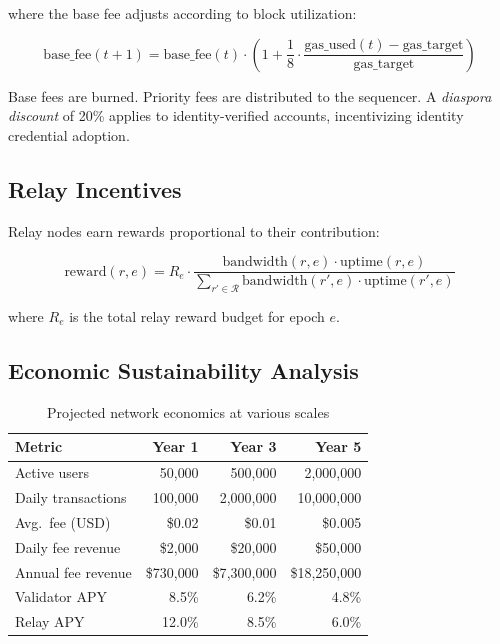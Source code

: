 \documentclass[11pt,a4paper]{article}
\begin{document}
where the base fee adjusts according to block utilization:

\begin{equation}
\text{base\_fee}(t+1) = \text{base\_fee}(t) \cdot \left(1 + \frac{1}{8} \cdot \frac{\text{gas\_used}(t) - \text{gas\_target}}{\text{gas\_target}}\right)
\end{equation}

Base fees are burned. Priority fees are distributed to the sequencer. A \emph{diaspora discount} of 20\% applies to identity-verified accounts, incentivizing identity credential adoption.

\subsection{Relay Incentives}

Relay nodes earn rewards proportional to their contribution:

\begin{equation}
\text{reward}(r, e) = R_e \cdot \frac{\text{bandwidth}(r, e) \cdot \text{uptime}(r, e)}{\sum_{r' \in \mathcal{R}} \text{bandwidth}(r', e) \cdot \text{uptime}(r', e)}
\end{equation}

where $R_e$ is the total relay reward budget for epoch $e$.

\subsection{Economic Sustainability Analysis}

\begin{table}[H]
\centering
\caption{Projected network economics at various scales}
\label{tab:economics}
\begin{tabular}{lrrr}
\toprule
\textbf{Metric} & \textbf{Year 1} & \textbf{Year 3} & \textbf{Year 5} \\
\midrule
Active users & 50{,}000 & 500{,}000 & 2{,}000{,}000 \\
Daily transactions & 100{,}000 & 2{,}000{,}000 & 10{,}000{,}000 \\
Avg.\ fee (USD) & \$0.02 & \$0.01 & \$0.005 \\
Daily fee revenue & \$2{,}000 & \$20{,}000 & \$50{,}000 \\
Annual fee revenue & \$730{,}000 & \$7{,}300{,}000 & \$18{,}250{,}000 \\
Validator APY & 8.5\% & 6.2\% & 4.8\% \\
Relay APY & 12.0\% & 8.5\% & 6.0\% \\
\bottomrule
\end{tabular}
\end{table}
\end{document}

